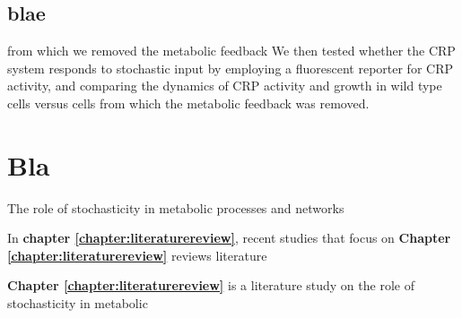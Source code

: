 

\section{blae}

from which we removed the metabolic feedback 
%
We then tested 
whether the CRP system responds to stochastic input by 
employing a fluorescent reporter for CRP activity, 
and comparing the dynamics of CRP activity and growth in 
wild type cells versus cells from which the metabolic feedback was removed.
%




\chapter*{Bla}


The role of stochasticity in metabolic processes and networks 

In \textbf{chapter \ref{chapter:literaturereview}}, recent studies that focus on 
\textbf{Chapter \ref{chapter:literaturereview}} reviews literature 




\textbf{Chapter \ref{chapter:literaturereview}} is a literature study on the role of stochasticity in metabolic 

